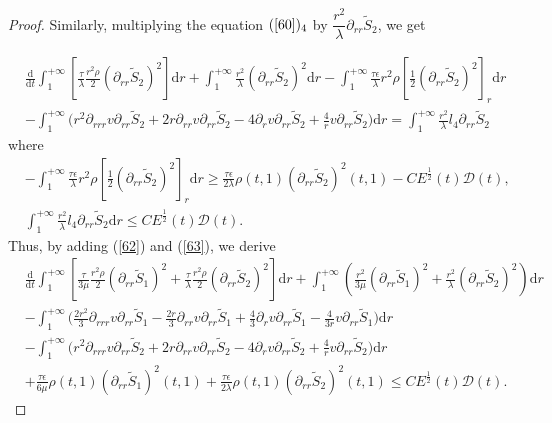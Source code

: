 \documentclass[10pt,reqno]{amsart}
\numberwithin{equation}{section}
\begin{document}
\begin{proof}
		Similarly, multiplying the equation $(\ref{60})_4$ by  $\dfrac{r^2}{\lambda}\partial_{rr} \tilde{S}_2$, we get
		
		\begin{equation}
			\begin{aligned}\label{63}
				&\frac{\mathrm{d}}{\mathrm{d} t}\int_{1}^{+\infty}\left[\frac{\tau }{\lambda} \frac{r^2 \rho}{2}(\partial_{rr} \tilde{S}_2)^2\right]\mathrm{d}r
				+\int_{1}^{+\infty}\frac{r^2}{\lambda}(\partial_{rr} \tilde{S}_2)^2\mathrm{d}r
				-\int_{1}^{+\infty}
				\frac{\tau\epsilon}{\lambda}r^2\rho [\frac{1}{2}(\partial_{rr}\tilde{S}_2)^2]_r\mathrm{d}r\\
				&-\int_{1}^{+\infty}\bigg(r^2\partial_{rrr}v\partial_{rr} \tilde{S}_2 +2r\partial_{rr}v\partial_{rr} \tilde{S}_2
				-4\partial_{r}v\partial_{rr} \tilde{S}_2+\frac{4}{r}v\partial_{rr} \tilde{S}_2\bigg)\mathrm{d}r =\int_{1}^{+\infty}\frac{r^2}{\lambda}l_4\partial_{rr}\tilde{S}_2
			\end{aligned}
		\end{equation}
		where
		\begin{equation}\nonumber
			\begin{aligned}
				&-\int_{1}^{+\infty}
				\frac{\tau \epsilon}{\lambda}r^2\rho[\frac{1}{2}(\partial_{rr}\tilde{S}_2)^2]_r\mathrm{d}r
				\geq \frac{\tau\epsilon}{2\lambda}\rho(t,1)(\partial_{rr}\tilde{S}_2)^2(t,1)
				- C E^{\frac{1}{2}}(t) \mathcal{D}(t),\\
				&\int_{1}^{+\infty}\frac{r^2}{\lambda}l_4\partial_{rr} \tilde{S}_2\mathrm{d}r
				\leq C E^{\frac{1}{2}}(t) \mathcal{D}(t).
			\end{aligned}
		\end{equation}
		Thus, by adding (\ref{62}) and (\ref{63}), we derive
		\begin{equation}\label{3.80}
			\begin{aligned}
				&\frac{\mathrm{d}}{\mathrm{d} t}\int_{1}^{+\infty}\left[\frac{\tau}{3 \mu} \frac{r^2 \rho}{2}(\partial_{rr} \tilde{S}_1)^2+\frac{\tau }{\lambda} \frac{r^2 \rho}{2}(\partial_{rr} \tilde{S}_2)^2\right]\mathrm{d}r
				+\int_{1}^{+\infty}\left(\frac{r^2}{3 \mu}(\partial_{rr} \tilde{S}_1)^2+\frac{r^2}{\lambda}(\partial_{rr} \tilde{S}_2)^2\right)\mathrm{d}r
				\\
				&-\int_{1}^{+\infty}\bigg(\frac{2r^2}{3}\partial_{rrr} v\partial_{rr} \tilde{S}_1- \frac{2r}{3}\partial_{rr} v\partial_{rr}\tilde{S}_1
				+\frac{4}{3} \partial_{r}v\partial_{rr} \tilde{S}_1-\frac{4}{3r}v\partial_{rr} \tilde{S}_1
				\bigg)\mathrm{d}r\\
				&-\int_{1}^{+\infty}\bigg(r^2\partial_{rrr}v\partial_{rr} \tilde{S}_2 +2r\partial_{rr}v\partial_{rr} \tilde{S}_2
				-4\partial_{r}v\partial_{rr} \tilde{S}_2+\frac{4}{r}v\partial_{rr} \tilde{S}_2\bigg)\mathrm{d}r\\
				&+\frac{\tau\epsilon}{6 \mu}\rho(t,1)(\partial_{rr}\tilde{S}_1)^2(t,1)
				+\frac{\tau\epsilon}{2\lambda}\rho(t,1)(\partial_{rr}\tilde{S}_2)^2(t,1)
				\leq C E^{\frac{1}{2}}(t) \mathcal{D}(t).
			\end{aligned}
		\end{equation}
		

\end{proof}
\end{document}
